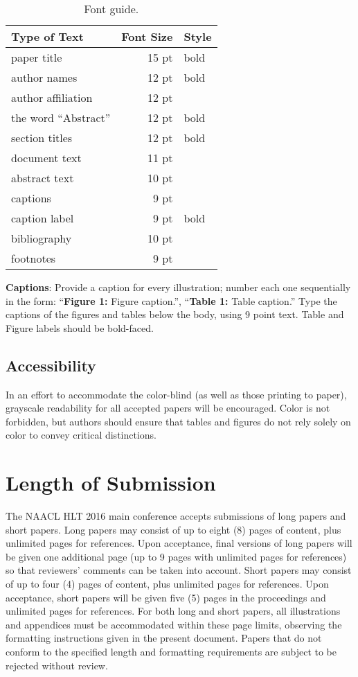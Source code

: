 \documentclass[11pt,letterpaper]{article}
\begin{document}
\begin{table}
\small
\centering
\begin{tabular}{|l|rl|}
\hline \bf Type of Text & \bf Font Size & \bf Style \\ \hline
paper title & 15 pt & bold \\
author names & 12 pt & bold \\
author affiliation & 12 pt & \\
the word ``Abstract'' & 12 pt & bold \\
section titles & 12 pt & bold \\
document text & 11 pt  &\\
abstract text & 10 pt & \\
captions & 9 pt & \\
caption label & 9 pt & bold \\
bibliography & 10 pt & \\
footnotes & 9 pt & \\
\hline
\end{tabular}
\caption{\label{font-table} Font guide.}
\end{table}

{\bf Captions}: Provide a caption for every illustration; number each one
sequentially in the form:  ``{\bf Figure 1:} Figure caption.'', ``{\bf Table 1:} Table caption.''  Type the captions of the figures and 
tables below the body, using 9 point text.  Table and Figure labels should be bold-faced.

\subsection{Accessibility}
\label{ssec:accessibility}

In an effort to accommodate the color-blind (as well as those printing
to paper), grayscale readability for all accepted papers will be
encouraged.  Color is not forbidden, but authors should ensure that
tables and figures do not rely solely on color to convey critical
distinctions.

\section{Length of Submission}
\label{sec:length}

The NAACL HLT 2016 main conference accepts submissions of long papers and short papers.  Long papers may consist of up to eight (8) pages of content, plus unlimited pages for references. Upon acceptance, final versions of long papers will be given one additional page (up to 9 pages with unlimited pages for references) so that reviewers' comments can be taken into account.  Short papers may consist of up to four (4) pages of content, plus unlimited pages for references. Upon acceptance, short papers will be given five (5) pages in the proceedings and unlimited pages for references.  For both long and short papers, all illustrations and appendices must be accommodated within these page limits, observing the formatting instructions given in the present document.  Papers that do not conform to the specified length and formatting requirements are subject to be rejected without review.
\end{document}
